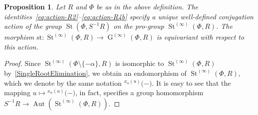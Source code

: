\documentclass[oneside, 11pt]{amsart}
\numberwithin{equation}{section}
\newtheorem{prop}[lemma]{Proposition}
\theoremstyle{definition}
\theoremstyle{remark}
\DeclareMathOperator\St{St}
\DeclareMathOperator\GG{G}
\DeclareMathOperator\Aut{Aut}
\newcommand{\up}[2]{{^{#1}\!{#2}}}
\begin{document}
\begin{prop}\label{SteinbergLocalAction}
 Let $R$ and $\Phi$ be as in the above definition.
 The identities~\eqref{eq:action-R2}--\eqref{eq:action-R4b} specify a unique well-defined conjugation action of the group \(\St(\Phi, S^{-1} R)\) on the pro-group \(\St^{(\infty)}(\Phi, R)\).
 The morphism \(\mathrm{st} \colon \St^{(\infty)}(\Phi, R) \to \GG^{(\infty)}(\Phi, R)\) is equivariant with respect to this action.
\end{prop}
\begin{proof}
 Since $\St^{(\infty)}(\Phi\setminus\{-\alpha\}, R)$ is isomorphic to $\St^{(\infty)}(\Phi, R)$ by~\cref{SingleRootElimination}, we obtain an endomorphism of $\St^{(\infty)}(\Phi, R)$, which we denote by the same notation $\up{x_\alpha(u)}(-)$. It is easy to see that the mapping $u \mapsto \up{x_\alpha(u)}(-)$, in fact, specifies a group homomorphism $S^{-1}R \to \Aut(\St^{(\infty)}(\Phi, R))$. 
 

\end{proof}
\end{document}
